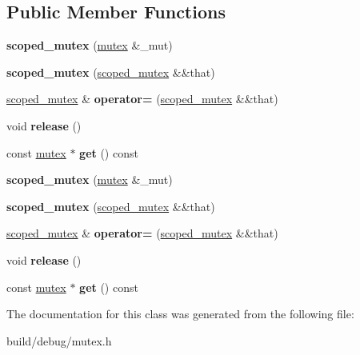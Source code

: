\subsection*{Public Member Functions}
\begin{DoxyCompactItemize}
\item 
\hypertarget{classscoped__mutex_a696f6dd538fcbd364211d70f9efcaf44}{{\bfseries scoped\-\_\-mutex} (\hyperlink{classmutex}{mutex} \&\-\_\-mut)}\label{classscoped__mutex_a696f6dd538fcbd364211d70f9efcaf44}

\item 
\hypertarget{classscoped__mutex_afb0edb1fb3877d36fd30555d653a0113}{{\bfseries scoped\-\_\-mutex} (\hyperlink{classscoped__mutex}{scoped\-\_\-mutex} \&\&that)}\label{classscoped__mutex_afb0edb1fb3877d36fd30555d653a0113}

\item 
\hypertarget{classscoped__mutex_a0665a61f38e54efadf756abf92ed8360}{\hyperlink{classscoped__mutex}{scoped\-\_\-mutex} \& {\bfseries operator=} (\hyperlink{classscoped__mutex}{scoped\-\_\-mutex} \&\&that)}\label{classscoped__mutex_a0665a61f38e54efadf756abf92ed8360}

\item 
\hypertarget{classscoped__mutex_a07e9a187027c97839b139856605f7e13}{void {\bfseries release} ()}\label{classscoped__mutex_a07e9a187027c97839b139856605f7e13}

\item 
\hypertarget{classscoped__mutex_ae07654bdda62a614d199fc027901da03}{const \hyperlink{classmutex}{mutex} $\ast$ {\bfseries get} () const }\label{classscoped__mutex_ae07654bdda62a614d199fc027901da03}

\item 
\hypertarget{classscoped__mutex_a696f6dd538fcbd364211d70f9efcaf44}{{\bfseries scoped\-\_\-mutex} (\hyperlink{classmutex}{mutex} \&\-\_\-mut)}\label{classscoped__mutex_a696f6dd538fcbd364211d70f9efcaf44}

\item 
\hypertarget{classscoped__mutex_afb0edb1fb3877d36fd30555d653a0113}{{\bfseries scoped\-\_\-mutex} (\hyperlink{classscoped__mutex}{scoped\-\_\-mutex} \&\&that)}\label{classscoped__mutex_afb0edb1fb3877d36fd30555d653a0113}

\item 
\hypertarget{classscoped__mutex_a0665a61f38e54efadf756abf92ed8360}{\hyperlink{classscoped__mutex}{scoped\-\_\-mutex} \& {\bfseries operator=} (\hyperlink{classscoped__mutex}{scoped\-\_\-mutex} \&\&that)}\label{classscoped__mutex_a0665a61f38e54efadf756abf92ed8360}

\item 
\hypertarget{classscoped__mutex_a07e9a187027c97839b139856605f7e13}{void {\bfseries release} ()}\label{classscoped__mutex_a07e9a187027c97839b139856605f7e13}

\item 
\hypertarget{classscoped__mutex_ae07654bdda62a614d199fc027901da03}{const \hyperlink{classmutex}{mutex} $\ast$ {\bfseries get} () const }\label{classscoped__mutex_ae07654bdda62a614d199fc027901da03}

\end{DoxyCompactItemize}


The documentation for this class was generated from the following file\-:\begin{DoxyCompactItemize}
\item 
build/debug/mutex.\-h\end{DoxyCompactItemize}

